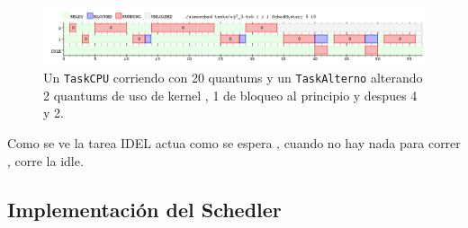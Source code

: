 	\begin{figure}[ht]
		\begin{center}
			\includegraphics[width=1\columnwidth]{imagenes/ej7_3.png}
			\caption{Un \texttt{TaskCPU} corriendo con 20 quantums y un \texttt{TaskAlterno} alterando 2 quantums de uso de kernel , 1 de bloqueo al principio y despues 4 y 2.}
		\end{center}
	\end{figure}

	Como se ve la tarea IDEL  actua como se espera , cuando no hay nada para correr , corre la idle.

	

\newpage

	\subsection{Implementación del Schedler}

